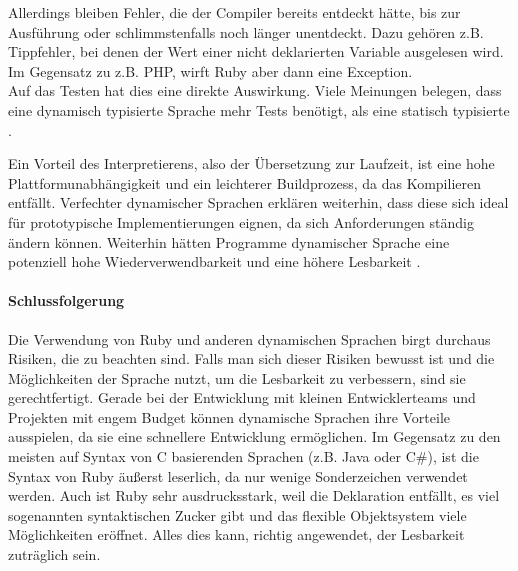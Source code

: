 Allerdings bleiben Fehler, die der Compiler bereits entdeckt hätte, bis zur Ausführung oder schlimmstenfalls noch länger unentdeckt. Dazu gehören z.B. Tippfehler, bei denen der Wert einer nicht deklarierten Variable ausgelesen wird. Im Gegensatz zu z.B. PHP, wirft Ruby aber dann eine Exception.\\
Auf das Testen hat dies eine direkte Auswirkung. Viele Meinungen belegen, dass eine dynamisch typisierte Sprache mehr Tests benötigt, als eine statisch typisierte \citep{daniel_spiewak_dynamic_2010}. 


Ein Vorteil des Interpretierens, also der Übersetzung zur Laufzeit, ist eine hohe Plattformunabhängigkeit und ein leichterer Buildprozess, da das Kompilieren entfällt. 
Verfechter dynamischer Sprachen erklären weiterhin, dass diese sich ideal für prototypische Implementierungen eignen, da sich Anforderungen ständig ändern können. Weiterhin hätten Programme dynamischer Sprache eine potenziell hohe Wiederverwendbarkeit und eine höhere Lesbarkeit \citep{meijer_static_2005} \citep{ousterhout_scripting:_1998}.


% 
% 
% 





\paragraph{Schlussfolgerung}
Die Verwendung von Ruby und anderen dynamischen Sprachen birgt durchaus Risiken, die zu beachten sind. Falls man sich dieser Risiken bewusst ist und die Möglichkeiten der Sprache nutzt, um die Lesbarkeit zu verbessern, sind sie gerechtfertigt. Gerade bei der Entwicklung mit kleinen Entwicklerteams und Projekten mit engem Budget können dynamische Sprachen ihre Vorteile ausspielen, da sie eine schnellere Entwicklung ermöglichen. Im Gegensatz zu den meisten auf Syntax von C basierenden Sprachen (z.B. Java oder C\#), ist die Syntax von Ruby äußerst leserlich, da nur wenige Sonderzeichen verwendet werden. Auch ist Ruby sehr ausdrucksstark, weil die Deklaration entfällt, es viel sogenannten syntaktischen Zucker gibt und das flexible Objektsystem viele Möglichkeiten eröffnet. Alles dies kann, richtig angewendet, der Lesbarkeit zuträglich sein.


